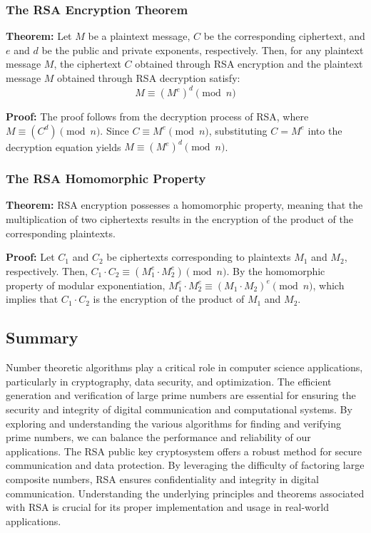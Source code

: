 \documentclass{article}
\renewcommand{\_}{\ifincsname_\else\legacyunderscore\fi}
\begin{document}
\subsubsection{The RSA Encryption Theorem}

\textbf{Theorem:} Let \(M\) be a plaintext message, \(C\) be the corresponding ciphertext, and \(e\) and \(d\) be the public and private exponents, respectively. Then, for any plaintext message \(M\), the ciphertext \(C\) obtained through RSA encryption and the plaintext message \(M\) obtained through RSA decryption satisfy:
\[ M \equiv (M^e)^d \pmod{n} \]

\textbf{Proof:} The proof follows from the decryption process of RSA, where \(M \equiv (C^d) \pmod{n}\). Since \(C \equiv M^e \pmod{n}\), substituting \(C = M^e\) into the decryption equation yields \(M \equiv (M^e)^d \pmod{n}\).

\subsubsection{The RSA Homomorphic Property}

\textbf{Theorem:} RSA encryption possesses a homomorphic property, meaning that the multiplication of two ciphertexts results in the encryption of the product of the corresponding plaintexts.

\textbf{Proof:} Let \(C_1\) and \(C_2\) be ciphertexts corresponding to plaintexts \(M_1\) and \(M_2\), respectively. Then, \(C_1 \cdot C_2 \equiv (M_1^e \cdot M_2^e) \pmod{n}\). By the homomorphic property of modular exponentiation, \(M_1^e \cdot M_2^e \equiv (M_1 \cdot M_2)^e \pmod{n}\), which implies that \(C_1 \cdot C_2\) is the encryption of the product of \(M_1\) and \(M_2\).


\subsection{Summary}
Number theoretic algorithms play a critical role in computer science applications, particularly in cryptography, data security, and optimization. The efficient generation and verification of large prime numbers are essential for ensuring the security and integrity of digital communication and computational systems. By exploring and understanding the various algorithms for finding and verifying prime numbers, we can balance the performance and reliability of our applications. The RSA public key cryptosystem offers a robust method for secure communication and data protection. By leveraging the difficulty of factoring large composite numbers, RSA ensures confidentiality and integrity in digital communication. Understanding the underlying principles and theorems associated with RSA is crucial for its proper implementation and usage in real-world applications. 
\end{document}
